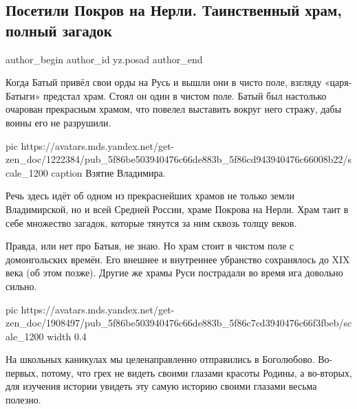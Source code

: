 
 
 
 
 
 
\subsection{Посетили Покров на Нерли. Таинственный храм, полный загадок}
\label{sec:14_10_2020.sites.ru.zen_yandex.yz.posad.1.pokrov_na_nerli}
\ifcmt
  author_begin
   author_id yz.posad
  author_end
\fi


Когда Батый привёл свои орды на Русь и вышли они в чисто поле, взгляду
«царя-Батыги» предстал храм. Стоял он один в чистом поле. Батый был настолько
очарован прекрасным храмом, что повелел выставить вокруг него стражу, дабы
воины его не разрушили.

\ifcmt
  pic https://avatars.mds.yandex.net/get-zen_doc/1222384/pub_5f86be503940476c66de883b_5f86cd943940476c66008b22/scale_1200
  caption Взятие Владимира.
\fi

Речь здесь идёт об одном из прекраснейших храмов не только земли Владимирской,
но и всей Средней России, храме Покрова на Нерли. Храм таит в себе множество
загадок, которые тянутся за ним сквозь толщу веков.

Правда, или нет про Батыя, не знаю. Но храм стоит в чистом поле с домонгольских
времён. Его внешнее и внутреннее убранство сохранялось до XIX века (об этом
позже). Другие же храмы Руси пострадали во время ига довольно сильно.

\ifcmt
  pic https://avatars.mds.yandex.net/get-zen_doc/1908497/pub_5f86be503940476c66de883b_5f86c7cd3940476c66f3fbeb/scale_1200
  width 0.4
\fi

На школьных каникулах мы целенаправленно отправились в Боголюбово. Во-первых,
потому, что грех не видеть своими глазами красоты Родины, а во-вторых, для
изучения истории увидеть эту самую историю своими глазами весьма полезно.

